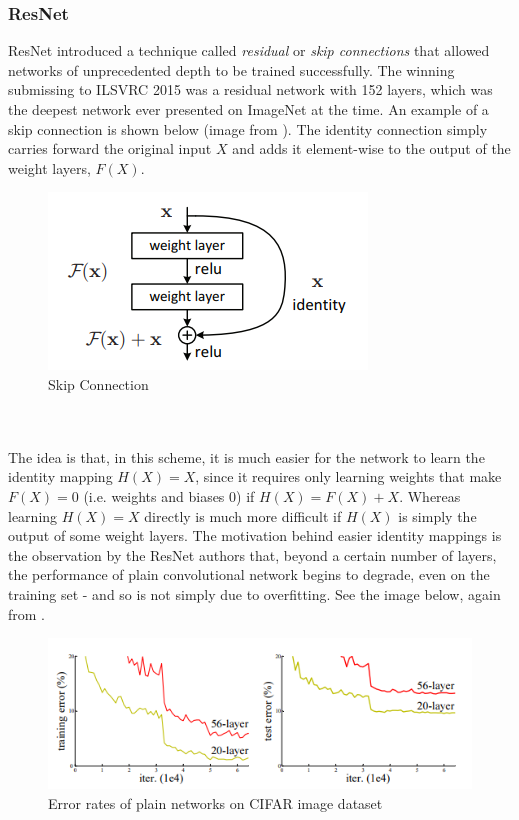 \documentclass[11pt]{article} %
\theoremstyle{plain}
\theoremstyle{definition}
\begin{document}
\subsubsection{ResNet}
ResNet \cite{ResNet_Paper} introduced a technique called \textit{residual} or \textit{skip connections} that allowed networks of unprecedented depth to be trained successfully. The winning submissing to ILSVRC 2015 was a residual network with 152 layers, which was the deepest network ever presented on ImageNet at the time. An example of a skip connection is shown below (image from \cite{ResNet_Paper}). The identity connection simply carries forward the original input \(X\) and adds it element-wise to the output of the weight layers, \(F(X)\).
\begin{figure}[!ht]
  \centering    
  \caption{Skip Connection}
  \label{fig:Skip_Connection}
  \includegraphics[scale=0.7]{SkipConnection.PNG}
\end{figure}
\\
\\
\noindent
The idea is that, in this scheme, it is much easier for the network to learn the identity mapping \(H(X)=X\), since it requires only learning weights that make \(F(X)=0\) (i.e. weights and biases 0) if \(H(X) = F(X) + X\). Whereas learning \(H(X)=X\) directly is much more difficult if \(H(X)\) is simply the output of some weight layers. The motivation behind easier identity mappings is the observation by the ResNet authors that, beyond a certain number of layers, the performance of plain convolutional network begins to degrade, even on the training set - and so is not simply due to overfitting. See the image below, again from \cite{ResNet_Paper}.
\begin{figure}[!ht]
  \centering    
  \caption{Error rates of plain networks on CIFAR image dataset}
  \label{fig:ResNet_TrainError}
  \includegraphics[scale=0.7]{ResNet_TrainError.PNG}
\end{figure}
\end{document}

